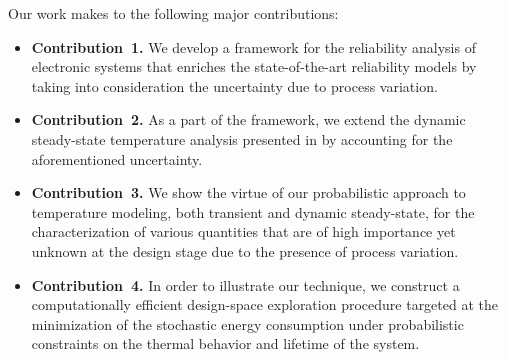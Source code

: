 Our work makes to the following major contributions:
\begin{itemize}
  \item {\bfseries Contribution~1.} We develop a framework for the reliability analysis of electronic systems that enriches the state-of-the-art reliability models by taking into consideration the uncertainty due to process variation.
  \item {\bfseries Contribution~2.} As a part of the framework, we extend the dynamic steady-state temperature analysis presented in \cite{ukhov2012} by accounting for the aforementioned uncertainty.
  \item {\bfseries Contribution~3.} We show the virtue of our probabilistic approach to temperature modeling, both transient and dynamic steady-state, for the characterization of various quantities that are of high importance yet unknown at the design stage due to the presence of process variation.
  \item {\bfseries Contribution~4.} In order to illustrate our technique, we construct a computationally efficient design-space exploration procedure targeted at the minimization of the stochastic energy consumption under probabilistic constraints on the thermal behavior and lifetime of the system.
\end{itemize}
